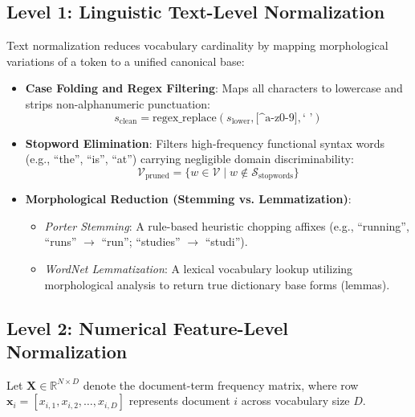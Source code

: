 \documentclass[12pt]{article}
\begin{document}
\subsection{Level 1: Linguistic Text-Level Normalization}
Text normalization reduces vocabulary cardinality by mapping morphological variations of a token to a unified canonical base:
\begin{itemize}
    \item \textbf{Case Folding and Regex Filtering}: Maps all characters to lowercase and strips non-alphanumeric punctuation:
    \begin{equation}
        s_{\text{clean}} = \text{regex\_replace}(s_{\text{lower}}, \text{[}\text{\textasciicircum a-z0-9}\text{]}, \text{` '})
    \end{equation}
    \item \textbf{Stopword Elimination}: Filters high-frequency functional syntax words (e.g., ``the'', ``is'', ``at'') carrying negligible domain discriminability:
    \begin{equation}
        \mathcal{V}_{\text{pruned}} = \{w \in \mathcal{V} \mid w \notin \mathcal{S}_{\text{stopwords}}\}
    \end{equation}
    \item \textbf{Morphological Reduction (Stemming vs. Lemmatization)}:
    \begin{itemize}
        \item \textit{Porter Stemming}: A rule-based heuristic chopping affixes (e.g., ``running'', ``runs'' $\to$ ``run''; ``studies'' $\to$ ``studi'').
        \item \textit{WordNet Lemmatization}: A lexical vocabulary lookup utilizing morphological analysis to return true dictionary base forms (lemmas).
    \end{itemize}
\end{itemize}

\subsection{Level 2: Numerical Feature-Level Normalization}
Let $\mathbf{X} \in \mathbb{R}^{N \times D}$ denote the document-term frequency matrix, where row $\mathbf{x}_i = [x_{i,1}, x_{i,2}, \dots, x_{i,D}]$ represents document $i$ across vocabulary size $D$.
\end{document}
